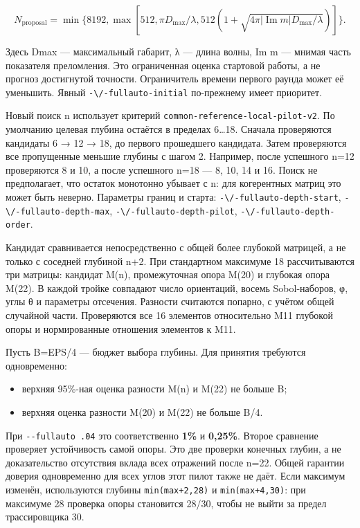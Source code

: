 \[N_{\mathrm{proposal}}=\min\{8192,\max[512,\pi D_{\max}/\lambda,
512(1+\sqrt{4\pi|\operatorname{Im}m|D_{\max}/\lambda})]\}.\]

Здесь Dmax --- максимальный габарит, λ --- длина волны, Im m --- мнимая
часть показателя преломления. Это ограниченная оценка стартовой работы,
а не прогноз достигнутой точности. Ограничитель времени первого раунда
может её уменьшить. Явный \nolinkurl{-\/-fullauto-initial} по-прежнему
имеет приоритет.

Новый поиск n использует критерий
\texttt{common-reference-local-pilot-v2}. По умолчанию целевая глубина
остаётся в пределах 6\ldots18. Сначала проверяются кандидаты 6 → 12 →
18, до первого прошедшего кандидата. Затем проверяются все пропущенные
меньшие глубины с шагом 2. Например, после успешного n=12 проверяются 8
и 10, а после успешного n=18 --- 8, 10, 14 и 16. Поиск не предполагает,
что остаток монотонно убывает с n: для когерентных матриц это может быть
неверно. Параметры границ и старта: \nolinkurl{-\/-fullauto-depth-start},
\nolinkurl{-\/-fullauto-depth-max}, \nolinkurl{-\/-fullauto-depth-pilot},
\nolinkurl{-\/-fullauto-depth-order}.

Кандидат сравнивается непосредственно с общей более глубокой матрицей, а
не только с соседней глубиной n+2. При стандартном максимуме 18
рассчитываются три матрицы: кандидат M(n), промежуточная опора M(20) и
глубокая опора M(22). В каждой тройке совпадают число ориентаций, восемь
Sobol-наборов, φ, углы θ и параметры отсечения. Разности считаются
попарно, с учётом общей случайной части. Проверяются все 16 элементов
относительно M11 глубокой опоры и нормированные отношения элементов к
M11.

Пусть B=EPS/4 --- бюджет выбора глубины. Для принятия требуются
одновременно:

\begin{itemize}
\tightlist
\item
  верхняя 95\%-ная оценка разности M(n) и M(22) не больше B;
\item
  верхняя оценка разности M(20) и M(22) не больше B/4.
\end{itemize}

При \texttt{-\/-fullauto\ .04} это соответственно \textbf{1\%} и
\textbf{0,25\%}. Второе сравнение проверяет устойчивость самой опоры.
Это две проверки конечных глубин, а не доказательство отсутствия вклада
всех отражений после n=22. Общей гарантии доверия одновременно для всех
углов этот пилот также не даёт. Если максимум изменён, используются
глубины \texttt{min(max+2,28)} и \texttt{min(max+4,30)}: при максимуме
28 проверка опоры становится 28/30, чтобы не выйти за предел
трассировщика 30.

